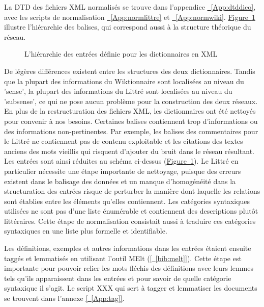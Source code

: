 \documentclass[a4paper, 12pt]{article}
\begin{document}
La DTD des fichiers XML normalisés se trouve dans l'appendice 
\hyperref[App:dtddico]{~\ref*{App:dtddico}}, 
avec les scripts de normalisation 
\hyperref[App:normlittre]{~\ref*{App:normlittre}} et 
\hyperref[App:normwiki]{~\ref*{App:normwiki}}. 
\hyperref[fig:XMLhierarchy]{Figure~\ref*{fig:XMLhierarchy}} illustre 
l'hiérarchie des balises, qui correspond aussi à la structure théorique du 
réseau.

\begin{figure}[!ht]
\centering
\def\svgwidth{\columnwidth}

\caption{L'hiérarchie des entrées définie pour les dictionnaires en XML}
\label{fig:XMLhierarchy}
\end{figure}


De légères différences existent entre les structures des deux dictionnaires. 
Tandis que la plupart des informations du Wiktionnaire sont localisées au niveau 
du 'sense', la plupart des informations du Littré sont localisées au niveau du 
'subsense', ce qui ne pose aucun problème pour la construction des deux réseaux.
\newline
\newline
En plus de la restructuration des fichiers XML, les dictionnaires ont été 
nettoyés pour convenir à nos besoins. Certaines balises contiennent trop 
d'informations ou des informations non-pertinentes. Par exemple, les balises des 
commentaires pour le Littré ne contiennent pas de contenu exploitable et les 
citations des textes anciens des mots vieillis qui risquent d'ajouter du bruit 
dans le réseau résultant. Les entrées sont ainsi réduites au schéma ci-dessus 
(\hyperref[fig:XMLhierarchy]{Figure~\ref*{fig:XMLhierarchy}}). Le Littré en 
particulier nécessite une étape importante de nettoyage, puisque des erreurs 
existent dans le balisage des données et un manque d'homogénéité dans la 
structuration des entrées risque de perturber la manière dont laquelle les 
relations sont établies entre les éléments qu'elles contiennent. Les catégories 
syntaxiques utilisées ne sont pas d'une liste énumérable et contiennent des 
descriptions plutôt littéraires. Cette étape de normalisation consistait aussi à 
traduire ces catégories syntaxiques en une liste plus formelle et identifiable.

Les définitions, exemples et autres informations dans les entrées étaient 
ensuite taggés et lemmatisés en utilisant l'outil MElt 
(\hyperref[bib:melt]{[~\ref*{bib:melt}]}). Cette étape est importante pour 
pouvoir relier les mots fléchis des définitions avec leurs lemmes tels qu'ils 
apparaissent dans les entrées et pour savoir de quelle catégorie syntaxique il 
s'agit. Le script XXX qui sert à tagger et lemmatiser les documents se trouvent 
dans l'annexe \hyperref[App:tag]{[~\ref*{App:tag}]}.
\end{document}
